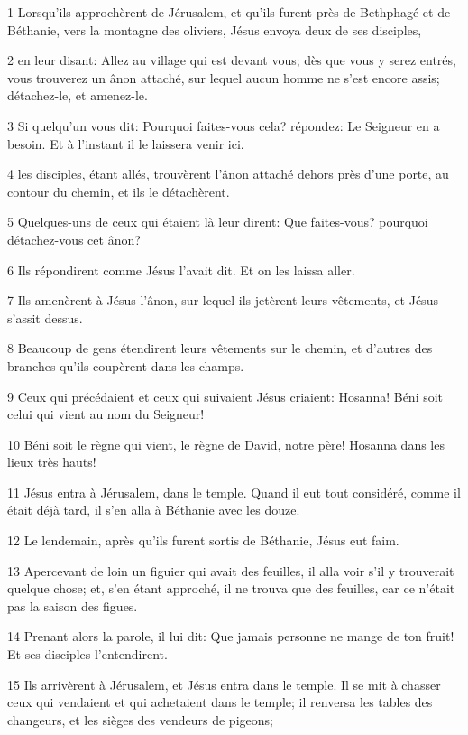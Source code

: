 \par 1 Lorsqu'ils approchèrent de Jérusalem, et qu'ils furent près de Bethphagé et de Béthanie, vers la montagne des oliviers, Jésus envoya deux de ses disciples,
\par 2 en leur disant: Allez au village qui est devant vous; dès que vous y serez entrés, vous trouverez un ânon attaché, sur lequel aucun homme ne s'est encore assis; détachez-le, et amenez-le.
\par 3 Si quelqu'un vous dit: Pourquoi faites-vous cela? répondez: Le Seigneur en a besoin. Et à l'instant il le laissera venir ici.
\par 4 les disciples, étant allés, trouvèrent l'ânon attaché dehors près d'une porte, au contour du chemin, et ils le détachèrent.
\par 5 Quelques-uns de ceux qui étaient là leur dirent: Que faites-vous? pourquoi détachez-vous cet ânon?
\par 6 Ils répondirent comme Jésus l'avait dit. Et on les laissa aller.
\par 7 Ils amenèrent à Jésus l'ânon, sur lequel ils jetèrent leurs vêtements, et Jésus s'assit dessus.
\par 8 Beaucoup de gens étendirent leurs vêtements sur le chemin, et d'autres des branches qu'ils coupèrent dans les champs.
\par 9 Ceux qui précédaient et ceux qui suivaient Jésus criaient: Hosanna! Béni soit celui qui vient au nom du Seigneur!
\par 10 Béni soit le règne qui vient, le règne de David, notre père! Hosanna dans les lieux très hauts!
\par 11 Jésus entra à Jérusalem, dans le temple. Quand il eut tout considéré, comme il était déjà tard, il s'en alla à Béthanie avec les douze.
\par 12 Le lendemain, après qu'ils furent sortis de Béthanie, Jésus eut faim.
\par 13 Apercevant de loin un figuier qui avait des feuilles, il alla voir s'il y trouverait quelque chose; et, s'en étant approché, il ne trouva que des feuilles, car ce n'était pas la saison des figues.
\par 14 Prenant alors la parole, il lui dit: Que jamais personne ne mange de ton fruit! Et ses disciples l'entendirent.
\par 15 Ils arrivèrent à Jérusalem, et Jésus entra dans le temple. Il se mit à chasser ceux qui vendaient et qui achetaient dans le temple; il renversa les tables des changeurs, et les sièges des vendeurs de pigeons;
